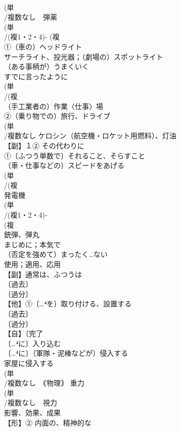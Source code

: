 \documentclass[8pt]{extreport}
\begin{document}
\begin{CJK}{UTF8}{min}
\\	(単
\\	/複数なし　弾薬
\\	(単
\\	/(複1・2・4)- (複
\\	①（車の）ヘッドライト　
\\	サーチライト、投光器；（劇場の）スポットライト
\\	（ある事柄が）うまくいく
\\	すでに言ったように
\\	(単
\\	/(複
\\	（手工業者の）作業〈仕事〉場
\\	②（乗り物での）旅行、ドライブ 
\\	(単
\\	/複数なし ケロシン（航空機・ロケット用燃料）、灯油
\\	【副】１② その代わりに
\\	①〔ふつう単数で〕それること、そらすこと
\\	（車・仕事などの）スピードをあげる
\\	(単
\\	/(複
\\	発電機
\\	(単
\\	/(複1・2・4)-
\\	(複
\\	銃弾、弾丸
\\	まじめに；本気で
\\	（否定を強めて）まったく…ない
\\	使用；適用、応用
\\	【副】通常は、ふつうは
\\	〔過去〕
\\	〔過分〕
\\	【他】①〔…⁴を〕取り付ける、設置する
\\	〔過去〕
\\	〔過分〕 
\\	【自】〔完了
\\	〔…⁴に〕入り込む　
\\	〔…⁴に〕（軍隊・泥棒などが）侵入する 
\\	家屋に侵入する
\\	(単
\\	/複数なし　｟物理｠ 重力
\\	(単
\\	/複数なし　視力
\\	影響、効果、成果
\\	【形】② 内面の、精神的な

\end{CJK}
\end{document}
